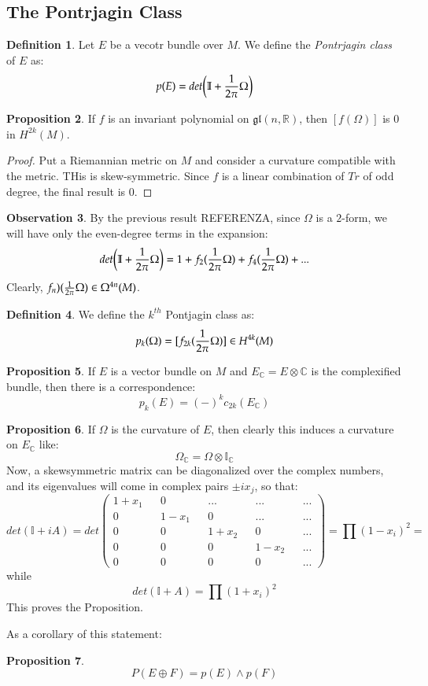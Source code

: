 \documentclass[12pt,a4paper]{report}
\theoremstyle{definition}
\newtheorem{Def}{Definition}[chapter]
\theoremstyle{Theorem}
\newtheorem{Prop}[Def]{Proposition}
\theoremstyle{break}
\theoremstyle{definition}
\newtheorem{Obs}[Def]{Observation}
\begin{document}
	\subsection{The Pontrjagin Class}
		\begin{Def}
			Let $E$ be a vecotr bundle over $M$. We define the \textit{Pontrjagin class} of $E$ as:
			$$p(E)=det\bigg(\mathbb{I}+{1\over 2\pi}\Omega\bigg)$$
		\end{Def}
		\begin{Prop}
			If $f$ is an invariant polynomial on $\mathfrak{gl}(n,\mathbb{R})$, then $[f(\Omega)]$ is 0 in $H^{2k}(M)$.
		\end{Prop}
		\begin{proof}
			Put a Riemannian metric on $M$ and consider a curvature compatible with the metric. THis is skew-symmetric. Since $f$ is a linear combination of $Tr$ of odd degree, the final result is 0.
		\end{proof}
		\begin{Obs}
			By the previous result REFERENZA, since $\Omega$ is a $2$-form, we will have only the even-degree terms in the expansion:
			$$det\bigg(\mathbb{I}+{1\over 2\pi}\Omega\bigg)=1+f_2({1\over 2\pi}\Omega)+f_4({1\over 2\pi}\Omega)+...$$
			Clearly, $f_n)({1\over 2\pi}\Omega)\in\Omega^{4n}(M)$.
		\end{Obs}
		\begin{Def}
			We define the $k^{th}$ Pontjagin class as:
			$$p_k(\Omega)=[f_{2k}({1\over 2\pi}\Omega)]\in H^{4k}(M)$$
		\end{Def}
		\begin{Prop}
			If $E$ is a vector bundle on $M$ and $E_\mathbb{C}=E\otimes \mathbb{C}$ is the complexified bundle, then there is a correspondence:
			$$p_k(E)=(-)^kc_{2k}(E_\mathbb{C})$$
		\end{Prop}
		\begin{Prop}
			If $\Omega$ is the curvature of $E$, then clearly this induces a curvature on $E_\mathbb{C}$ like:
			$$\Omega_\mathbb{C}=\Omega\otimes\mathbb{I}_\mathbb{C}$$
			Now, a skewsymmetric matrix can be diagonalized over the complex numbers, and its eigenvalues will come in complex pairs $\pm ix_j$, so that:
			$$det(\mathbb{I}+iA)=det\begin{pmatrix}
				1+x_1 && 0 && ... &&... && ...\\
				0 && 1-x_1 && 0 && ... && ...  \\
				0 && 0 && 1+x_2 && 0 &&...  \\
				0 && 0 && 0 && 1-x_2 &&...  \\
				0 && 0 && 0 && 0 &&... 
			\end{pmatrix}=\prod (1-x_i)^2=$$
			while
			$$det(\mathbb{I}+A)=\prod (1+x_i)^2$$
			This proves the Proposition.
		\end{Prop}
		As a corollary of this statement:
		\begin{Prop}
			$$P(E\oplus F)=p(E)\wedge p(F)$$
		\end{Prop}
\end{document}
